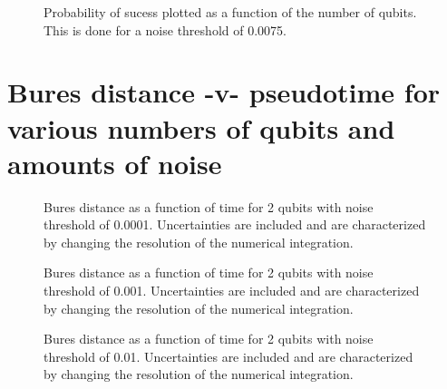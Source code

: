 \pagebreak

\begin{figure}[h]
\begin{center}
\end{center}
\caption{Probability of sucess plotted as a function of the number of qubits. This
is done for a noise threshold of 0.0075.}
\end{figure}


\pagebreak

\vfill
\section{Bures distance -v- pseudotime for various numbers of qubits and
amounts of noise}
\vfill

\pagebreak



\begin{figure}[h]
\begin{center}
\end{center}
\caption{Bures distance as a function of time for 2 qubits with noise
threshold of 0.0001.  Uncertainties are included and are characterized 
by changing the resolution of the numerical integration.}
\end{figure}

\pagebreak

\begin{figure}[h]
\begin{center}
\end{center}
\caption{Bures distance as a function of time for 2 qubits with noise
threshold of 0.001.  Uncertainties are included and are characterized 
by changing the resolution of the numerical integration.}
\end{figure}

\pagebreak

\begin{figure}[h]
\begin{center}
\end{center}
\caption{Bures distance as a function of time for 2 qubits with noise
threshold of 0.01.  Uncertainties are included and are characterized 
by changing the resolution of the numerical integration.}
\end{figure}


